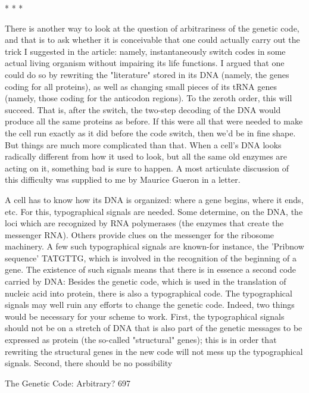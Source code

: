                                        *   *   *

        There is another way to look at the question of arbitrariness of the genetic
code, and that is to ask whether it is conceivable that one could actually carry out the
trick I suggested in the article: namely, instantaneously switch codes in some actual
living organism without impairing its life functions. I argued that one could do so by
rewriting the "literature" stored in its DNA (namely, the genes coding for all
proteins), as well as changing small pieces of its tRNA genes (namely, those coding
for the anticodon regions). To the zeroth order, this will succeed. That is, after the
switch, the two-step decoding of the DNA would produce all the same proteins as
before. If this were all that were needed to make the cell run exactly as it did before
the code switch, then we'd be in fine shape. But things are much more complicated
than that.
        When a cell's DNA looks radically different from how it used to look, but all
the same old enzymes are acting on it, something bad is sure to happen. A most
articulate discussion of this difficulty was supplied to me by Maurice Gueron in a
letter.

          A cell has to know how its DNA is organized: where a gene begins,
  where it ends, etc. For this, typographical signals are needed. Some determine,
  on the DNA, the loci which are recognized by RNA polymerases (the enzymes
  that create the messenger RNA). Others provide clues on the messenger for the
  ribosome machinery. A few such typographical signals are known-for instance,
  the 'Pribnow sequence' TATGTTG, which is involved in the recognition of the
  beginning of a gene. The existence of such signals means that there is in essence
  a second code carried by DNA: Besides the genetic code, which is used in the
  translation of nucleic acid into protein, there is also a typographical code.
          The typographical signals may well ruin any efforts to change the
  genetic code. Indeed, two things would be necessary for your scheme to work.
  First, the typographical signals should not be on a stretch of DNA that is also
  part of the genetic messages to be expressed as protein (the so-called
  "structural" genes); this is in order that rewriting the structural genes in the new
  code will not mess up the typographical signals. Second, there should be no
  possibility




The Genetic Code: Arbitrary?                                                         697

